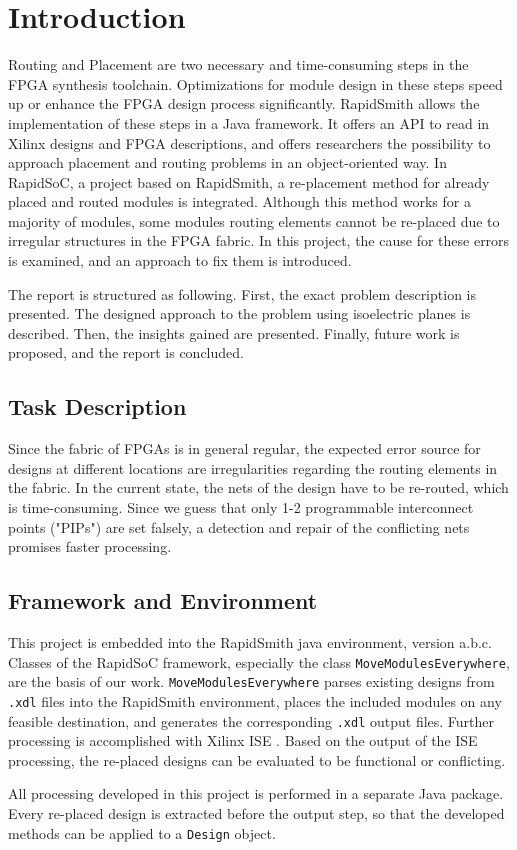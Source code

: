 \chapter{Introduction}
\label{cha:introduction}

Routing and Placement are two necessary and time-consuming steps in the FPGA synthesis toolchain. Optimizations for module design in these steps speed up or enhance the FPGA design process significantly. RapidSmith \cite{lavin} allows the implementation of these steps in a Java framework. It offers an API to read in Xilinx designs and FPGA descriptions, and offers researchers the possibility to approach placement and routing problems in an object-oriented way. In RapidSoC, a project based on RapidSmith, a re-placement method for already placed and routed modules is integrated. Although this method works for a majority of modules, some modules routing elements cannot be re-placed due to irregular structures in the FPGA fabric. In this project, the cause for these errors is examined, and an approach to fix them is introduced.

The report is structured as following. First, the exact problem description is presented. The designed approach to the problem using isoelectric planes is described. Then, the insights gained are presented. Finally, future work is proposed, and the report is concluded.


\section{Task Description}
\label{sec:taskdescription}
Since the fabric of FPGAs is in general regular, the expected error source for designs at different locations are irregularities regarding the routing elements in the fabric. In the current state, the nets of the design have to be re-routed, which is time-consuming. Since we guess that only 1-2 programmable interconnect points ("PIPs") are set falsely, a detection and repair of the conflicting nets promises faster processing. 

\section{Framework and Environment}
\label{sec:frameworkandenvironment}

This project is embedded into the RapidSmith java environment, version a.b.c. Classes of the RapidSoC framework, especially the class \texttt{MoveModulesEverywhere}, are the basis of our work. \texttt{MoveModulesEverywhere} parses existing designs from \texttt{.xdl} files into the RapidSmith environment, places the included modules on any feasible destination, and generates the corresponding \texttt{.xdl} output files. Further processing is accomplished with Xilinx ISE \cite{ise}. Based on the output of the ISE processing, the re-placed designs can be evaluated to be functional or conflicting.

All processing developed in this project is performed in a separate Java package. Every re-placed design is extracted before the output step, so that the developed methods can be applied to a \texttt{Design} object.